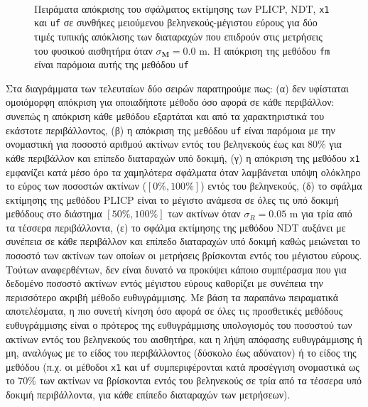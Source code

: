\begin{figure}
  \begin{subfigure}{\linewidth}
    
  \end{subfigure}\\
  \begin{subfigure}{\linewidth}
    
  \end{subfigure}
  \vspace{1cm}
  \caption{\small Πειράματα απόκρισης του σφάλματος εκτίμησης των PLICP, NDT,
           \texttt{x1} και \texttt{uf} σε συνθήκες μειούμενου
           βεληνεκούς-μέγιστου εύρους για δύο τιμές τυπικής απόκλισης των
           διαταραχών που επιδρούν στις μετρήσεις του φυσικού αισθητήρα όταν
           $\sigma_{\bm{M}} = 0.0$ m. Η απόκριση της μεθόδου \texttt{fm} είναι
           παρόμοια αυτής της μεθόδου \texttt{uf}}
  \label{fig:02_04_06:04}
\end{figure}

Στα διαγράμματα των τελευταίων δύο σειρών παρατηρούμε πως: (α) δεν υφίσταται
ομοιόμορφη απόκριση για οποιαδήποτε μέθοδο όσο αφορά σε κάθε περιβάλλον:
συνεπώς η απόκριση κάθε μεθόδου εξαρτάται και από τα χαρακτηριστικά του
εκάστοτε περιβάλλοντος, (β) η απόκριση της μεθόδου \texttt{uf} είναι παρόμοια
με την ονομαστική για ποσοστό αριθμού ακτίνων εντός του βεληνεκούς έως και
$80\%$ για κάθε περιβάλλον και επίπεδο διαταραχών υπό δοκιμή, (γ) η απόκριση
της μεθόδου \texttt{x1} εμφανίζει κατά μέσο όρο τα χαμηλότερα σφάλματα όταν
λαμβάνεται υπόψη ολόκληρο το εύρος των ποσοστών ακτίνων ($[0\%,100\%]$) εντός
του βεληνεκούς, (δ) το σφάλμα εκτίμησης της μεθόδου PLICP είναι το μέγιστο
ανάμεσα σε όλες τις υπό δοκιμή μεθόδους στο διάστημα $[50\%,100\%]$ των ακτίνων
όταν $\sigma_R = 0.05$ m για τρία από τα τέσσερα περιβάλλοντα, (ε) το σφάλμα
εκτίμησης της μεθόδου NDT αυξάνει με συνέπεια σε κάθε περιβάλλον και επίπεδο
διαταραχών υπό δοκιμή καθώς μειώνεται το ποσοστό των ακτίνων των οποίων οι
μετρήσεις βρίσκονται εντός του μέγιστου εύρους. Τούτων αναφερθέντων, δεν είναι
δυνατό να προκύψει κάποιο συμπέρασμα που για δεδομένο ποσοστό ακτίνων εντός
μέγιστου εύρους καθορίζει με συνέπεια την περισσότερο ακριβή μέθοδο
ευθυγράμμισης. Με βάση τα παραπάνω πειραματικά αποτελέσματα, η πιο συνετή
κίνηση όσο αφορά σε όλες τις προσθετικές μεθόδους ευθυγράμμισης είναι ο
πρότερος της ευθυγράμμισης υπολογισμός του ποσοστού των ακτίνων εντός του
βεληνεκούς του αισθητήρα, και η λήψη απόφασης ευθυγράμμισης ή μη, αναλόγως με
το είδος του περιβάλλοντος (δύσκολο έως αδύνατον) ή το είδος της μεθόδου (π.χ.
οι μέθοδοι \texttt{x1} και \texttt{uf} συμπεριφέρονται κατά προσέγγιση
ονομαστικά ως το $70\%$ των ακτίνων να βρίσκονται εντός του βεληνεκούς σε τρία
από τα τέσσερα υπό δοκιμή περιβάλλοντα, για κάθε επίπεδο διαταραχών των
μετρήσεων).
